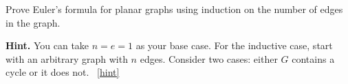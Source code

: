 \documentclass{book}
\begin{document}
\setcounter{project}{25}
\addtocounter{project}{-1}
\begin{activity}[]\label{activity-20}
\hypertarget{p-273}{}%
Prove Euler's formula for planar graphs using induction on the number of edges in the graph.%
\par\smallskip%
\noindent\textbf{Hint.}\hypertarget{hint-7}{}\quad%
\hypertarget{p-274}{}%
You can take \(n = e = 1\) as your base case.  For the inductive case, start with an arbitrary graph with \(n\) edges.  Consider two cases: either \(G\) contains a cycle or it does not.%
~\hfill{\tiny\hyperlink{a-25}{[hint]}\hypertarget{q-25}{}}\end{activity}

\clearpage
\end{document}
